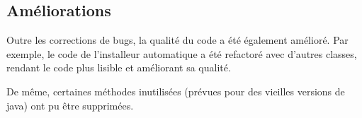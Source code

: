 \subsection{Améliorations}
Outre les corrections de bugs, la qualité du code a été également amélioré.
Par exemple, le code de l'installeur automatique a été refactoré avec d'autres classes, rendant le code plus lisible et améliorant sa qualité.

De même, certaines méthodes inutilisées (prévues pour des vieilles versions de java) ont pu être supprimées.